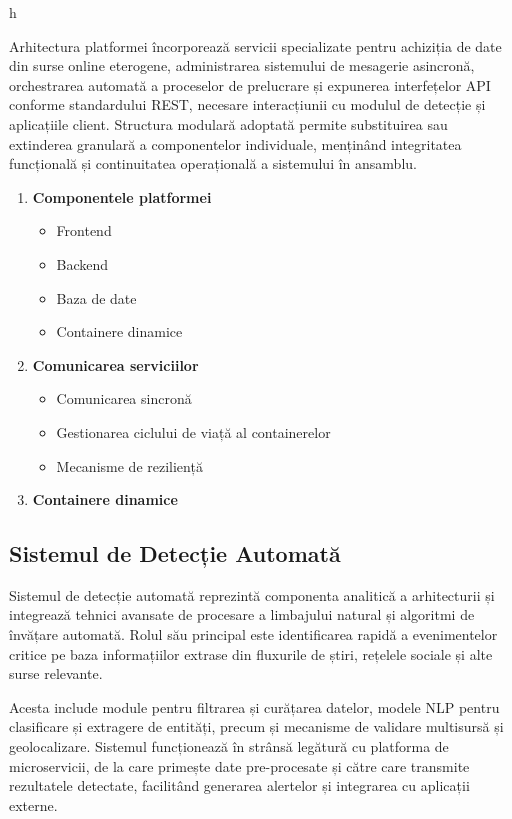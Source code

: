 h\documentclass[12pt,a4paper]{article}
\begin{document}
Arhitectura platformei încorporează servicii specializate pentru achiziția de date din surse online eterogene, administrarea sistemului de mesagerie asincronă, orchestrarea automată a proceselor de prelucrare și expunerea interfețelor API conforme standardului REST, necesare interacțiunii cu modulul de detecție și aplicațiile client. Structura modulară adoptată permite substituirea sau extinderea granulară a componentelor individuale, menținând integritatea funcțională și continuitatea operațională a sistemului în ansamblu.

\begin{enumerate}
    \item \textbf{Componentele platformei}
        \begin{itemize}
            \item {Frontend}
            \item {Backend}
            \item {Baza de date}
            \item {Containere dinamice}
        \end{itemize}
    \item \textbf{Comunicarea serviciilor}
        \begin{itemize}
            \item {Comunicarea sincronă}
            \item {Gestionarea ciclului de viață al containerelor}
            \item {Mecanisme de reziliență}
        \end{itemize}
    \item \textbf{Containere dinamice}
\end{enumerate}


\subsection{Sistemul de Detecție Automată}
\label{subsubsec:detectie}

\hspace{1em}Sistemul de detecție automată reprezintă componenta analitică a arhitecturii și integrează tehnici avansate de procesare a limbajului natural și algoritmi de învățare automată. Rolul său principal este identificarea rapidă a evenimentelor critice pe baza informațiilor extrase din fluxurile de știri, rețelele sociale și alte surse relevante.

Acesta include module pentru filtrarea și curățarea datelor, modele NLP pentru clasificare și extragere de entități, precum și mecanisme de validare multisursă și geolocalizare. Sistemul funcționează în strânsă legătură cu platforma de microservicii, de la care primește date pre-procesate și către care transmite rezultatele detectate, facilitând generarea alertelor și integrarea cu aplicații externe.
\end{document}
